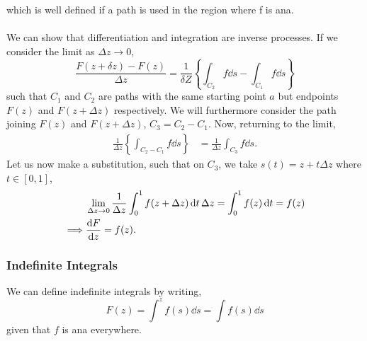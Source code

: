 \documentclass{book}
\begin{document}
which is well defined if a path is used in the region where f is ana.
\\\\
We can show that differentiation and integration are inverse processes. If we consider the limit as $\Delta z \to 0$,
\begin{equation}
	\frac{F(z+\delta z)-F(z)}{\Delta z} = \frac{1}{\delta Z} \left\{\int_{C_2}f\dd{s} - \int_{C_1}f\dd{s}\right\}
\end{equation}
such that $C_1$ and $C_2$ are paths with the same starting point $a$ but endpoints $F(z)$ and $F(z + \Delta z)$ respectively. We will furthermore consider the path joining $F(z)$ and $F(z+\Delta z)$, $C_3 = C_2 - C_1$. Now, returning to the limit,
\begin{align}
	\frac{1}{\Delta z}\left\{\int_{C_2 - C_1}f\dd s\right\} & = \frac{1}{\Delta z}\int_{C_3}f\dd{s}.
\end{align}
Let us now make a substitution, such that on $C_3$, we take $s(t) = z + t\Delta z$ where $t \in \left[0,1\right]$,
\begin{align}
	&\lim_{\Delta z \to 0}\frac{1}{\Delta z}\int_0^1f(z + \Delta z)\dd{t} \Delta z = \int_0^1f(z)\dd{t} = f(z) \\
	\implies &\dv{F}{z} = f(z).
\end{align}
\subsubsection{Indefinite Integrals}
We can define indefinite integrals by writing,
\begin{equation}
	F(z) = \int^zf(s)\dd{s} = \int f(s) \dd{s}
\end{equation}
given that $f$ is ana everywhere.
\end{document}
